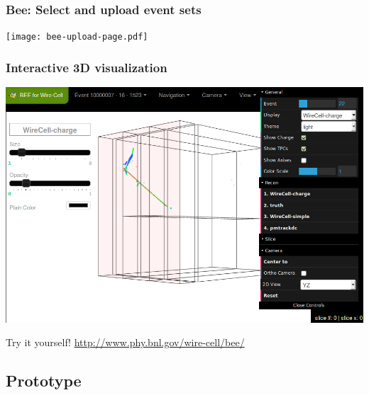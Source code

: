 \documentclass[xcolor=dvipsnames]{beamer}
\begin{document}
\begin{frame}[fragile]
  \frametitle{Bee: Select and upload event sets}
  \begin{center}
    \vspace{-5mm}

    \texttt{[image: bee-upload-page.pdf]}
  \end{center}
\end{frame}

\begin{frame}
  \frametitle{Interactive 3D visualization}
  \begin{center}
    \includegraphics[height=0.7\textheight]{bee-full-gui.png}    
  \end{center}
  \begin{center}
    Try it yourself! \url{http://www.phy.bnl.gov/wire-cell/bee/}
  \end{center}
\end{frame}


\subsection{Prototype}
\end{document}
